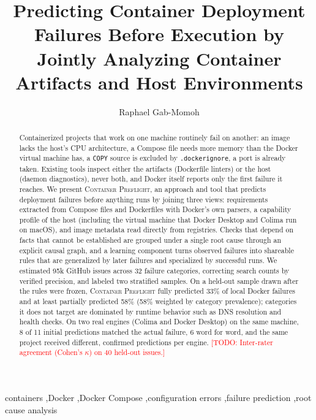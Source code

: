 \documentclass[preprint,12pt]{elsarticle}
\newcommand{\todo}[1]{\textcolor{red}{[TODO: #1]}}
\newcommand{\tool}{\textsc{Container Preflight}}
\begin{document}
\begin{frontmatter}

\title{Predicting Container Deployment Failures Before Execution by Jointly Analyzing Container Artifacts and Host Environments}

\author[1]{Raphael Gab-Momoh}

\begin{abstract}
Containerized projects that work on one machine routinely fail on another: an image lacks the host's CPU architecture, a Compose file needs more memory than the Docker virtual machine has, a \texttt{COPY} source is excluded by \texttt{.dockerignore}, a port is already taken. Existing tools inspect either the artifacts (Dockerfile linters) or the host (daemon diagnostics), never both, and Docker itself reports only the first failure it reaches. We present \tool{}, an approach and tool that predicts deployment failures before anything runs by joining three views: requirements extracted from Compose files and Dockerfiles with Docker's own parsers, a capability profile of the host (including the virtual machine that Docker Desktop and Colima run on macOS), and image metadata read directly from registries. Checks that depend on facts that cannot be established are grouped under a single root cause through an explicit causal graph, and a learning component turns observed failures into shareable rules that are generalized by later failures and specialized by successful runs. We estimated 95k GitHub issues across 32 failure categories, correcting search counts by verified precision, and labeled two stratified samples. On a held-out sample drawn after the rules were frozen, \tool{} fully predicted 33\% of local Docker failures and at least partially predicted 58\% (58\% weighted by category prevalence); categories it does not target are dominated by runtime behavior such as DNS resolution and health checks. On two real engines (Colima and Docker Desktop) on the same machine, 8 of 11 initial predictions matched the actual failure, 6 word for word, and the same project received different, confirmed predictions per engine. \todo{Inter-rater agreement (Cohen's $\kappa$) on 40 held-out issues.}
\end{abstract}

\begin{keyword}
containers \sep Docker \sep Docker Compose \sep configuration errors \sep failure prediction \sep root cause analysis
\end{keyword}

\end{frontmatter}
\end{document}

